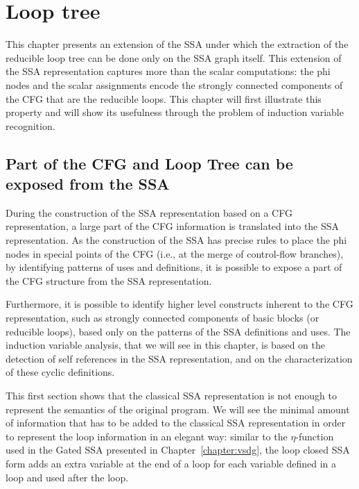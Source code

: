 \chapter{Loop tree }
\graphicspath{{fig/}{loop_tree/fig/}{part3/loop_tree/fig/}}


\providecommand{\SSA}{SSA}
\providecommand{\CFG}{CFG}
\providecommand{\loopphi}{loop-$\phi$}
\providecommand{\closephi}{close-$\phi$}
\providecommand{\CHREC}[1]{\{#1\}}

This chapter presents an extension of the \SSA{} under which the
extraction of the reducible loop tree can be done only on the \SSA{}
graph itself.  This extension of the \SSA{} representation captures
more than the scalar computations: the phi nodes and the scalar
assignments encode the strongly connected components of the CFG that
are the reducible loops.  This chapter will first illustrate this property and will show its usefulness through the problem of induction variable recognition.

\section{Part of the \CFG{} and Loop Tree can be exposed from the \SSA{}}

During the construction of the \SSA{} representation based on a \CFG{}
representation, a large part of the \CFG{} information is translated
into the \SSA{} representation.  As the construction of the \SSA{} has
precise rules to place the phi nodes in special points of the \CFG{}
(i.e., at the merge of control-flow branches), by identifying patterns
of uses and definitions, it is possible to expose a part of the \CFG{} structure
from the \SSA{} representation.

Furthermore, it is possible to identify higher level constructs
inherent to the \CFG{} representation, such as strongly connected
components of basic blocks (or reducible loops), based only on the
patterns of the \SSA{} definitions and uses.  The induction variable
analysis, that we will see in this chapter, is based on the detection
of self references in the \SSA{} representation, and on the
characterization of these cyclic definitions.

This first section shows that the classical \SSA{} representation is
not enough to represent the semantics of the original program.  We
will see the minimal amount of information that has to be added to the
classical \SSA{} representation in order to represent the loop
information in an elegant way: similar to the $\eta$-function used in the
Gated \SSA{} presented in Chapter~\ref{chapter:vsdg}, the loop closed \SSA{} form adds an extra variable at
the end of a loop for each variable defined in a loop and used after
the loop.

